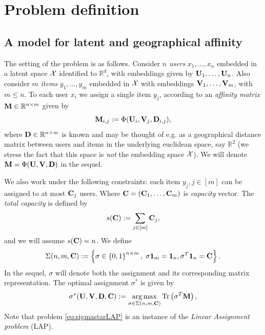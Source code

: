 \section{Problem definition}

\subsection*{A model for latent and geographical affinity}

The setting of the problem is as follows. Consider $n$ \emph{users} $x_1, \ldots, x_n$ embedded in a latent space $\mathcal {X}$ identified to $\mathbb{R}^d$, with embeddings given by $\mathbf{U}_1, \ldots, \mathbf{U}_n$. Also consider $m$ \emph{items} $y_1,\ldots, y_m$ embedded in $\mathcal {X}$ with embeddings $\mathbf{V}_1, \ldots, \mathbf{V}_m$, with $m \leq n$. To each user $x_i$ we assign a single item $y_j$, according to an \emph{affinity matrix} $\mathbf{M} \in \mathbb{R}^{n \times m}$ given by
\begin{equation*}\label{eq:def_M}
    \mathbf{M}_{i,j} := \Phi(\mathbf{U}_i,\mathbf{V}_j,\mathbf{D}_{i,j}),
\end{equation*} where $\mathbf{D} \in \mathbb{R}^{n \times m}$ is known and may be thought of e.g. as a geographical distance matrix between users and items in the underlying euclidean space, say $\mathbb{R}^2$ (we stress the fact that this space is \emph{not} the embedding space $\mathcal {X}$). We will denote $\mathbf{M} = \Phi(\mathbf{U},\mathbf{V},\mathbf{D})$ in the sequel.

We also work under the following constraints: each item $y_j, j \in [m]$ can be assigned to at most $\mathbf{C}_j$ users. Where $\mathbf{C}=(\mathbf{C}_1,\ldots,\mathbf{C}_m)$ is \emph{capacity} vector. The \emph{total capacity} is defined by
\begin{equation*}
    s(\mathbf{C}) := \sum_{j \in [m]} \mathbf{C}_j,
\end{equation*} and we will assume $s(\mathbf{C}) = n$.
We define
\begin{equation*}\label{eq:defSigma}
    \Sigma(n,m,\mathbf{C}) := \left\lbrace \sigma \in \left\{ 0,1\right\}^{n \times m}, \; {\sigma \mathbf{1}_m}  = { \mathbf{1}_n}, {\sigma^T \mathbf{1}_n} = \mathbf{C} \right\rbrace.
\end{equation*} In the sequel, $\sigma$ will denote both the assignment and its corresponding matrix representation. The optimal assignment $\sigma^*$ is given by
\begin{equation}\label{eq:sigmastarLAP}
    \sigma^*(\mathbf{U},\mathbf{V},\mathbf{D},\mathbf{C}) := \operatorname*{arg\,max}_{\sigma \in \Sigma(n,m,\mathbf{C})} {\rm Tr}\left( \sigma^T \mathbf{M} \right),
\end{equation}
Note that problem \eqref{eq:sigmastarLAP} is an instance of the \emph{Linear Assignment problem} (LAP).

